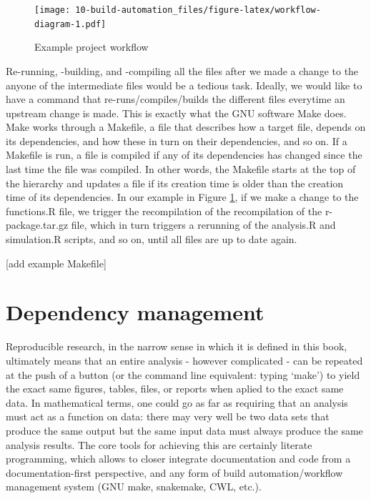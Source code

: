 \documentclass[]{book}
\begin{document}
\begin{figure}
\centering
\texttt{[image: 10-build-automation\_files/figure-latex/workflow-diagram-1.pdf]}
\caption{\label{fig:workflow-diagram}Example project workflow}
\end{figure}

Re-running, -building, and -compiling all the files after we made a
change to the anyone of the intermediate files would be a tedious task.
Ideally, we would like to have a command that re-runs/compiles/builds
the different files everytime an upstream change is made. This is
exactly what the GNU software Make does. Make works through a Makefile,
a file that describes how a target file, depends on its dependencies,
and how these in turn on their dependencies, and so on. If a Makefile is
run, a file is compiled if any of its dependencies has changed since the
last time the file was compiled. In other words, the Makefile starts at
the top of the hierarchy and updates a file if its creation time is
older than the creation time of its dependencies. In our example in
Figure \ref{fig:workflow-diagram}, if we make a change to the
functions.R file, we trigger the recompilation of the recompilation of
the r-package.tar.gz file, which in turn triggers a rerunning of the
analysis.R and simulation.R scripts, and so on, until all files are up
to date again.

{[}add example Makefile{]}

\chapter{Dependency management}\label{dependency-management}

Reproducible research, in the narrow sense in which it is defined in
this book, ultimately means that an entire analysis - however
complicated - can be repeated at the push of a button (or the command
line equivalent: typing `make') to yield the exact same figures, tables,
files, or reports when aplied to the exact same data. In mathematical
terms, one could go as far as requiring that an analysis must act as a
function on data: there may very well be two data sets that produce the
same output but the same input data must always produce the same
analysis results. The core tools for achieving this are certainly
literate programming, which allows to closer integrate documentation and
code from a documentation-first perspective, and any form of build
automation/workflow management system (GNU make, snakemake, CWL, etc.).
\end{document}
